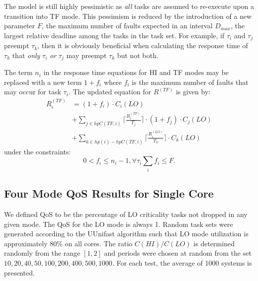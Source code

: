 	The model is still highly pessimistic as \emph{all} tasks are assumed to re-execute upon a transition into TF mode. 
	This pessimism is reduced by the introduction of a new parameter $F$, the maximum number of faults expected in an interval $D_{max}$, the largest relative deadline among the tasks in the task set.
	For example, if $\tau_i$ and $\tau_j$ preempt $\tau_k$, then it is obviously beneficial when calculating the response time of $\tau_k$ that \emph{only} $\tau_i$ \emph{or} $\tau_j$ may preempt $\tau_k$ but not both.

	The term $n_i$ in the response time equations for HI and TF modes may be replaced with a new term $1 + f_i$ where $f_i$ is the maximum number of faults that may occur for task $\tau_i$. The updated equation for $R^{(TF)}$ is given by:
	\begin{equation}\label{eq:mode3new}
\begin{aligned}
R_i^{(TF)} & = (1+f_i) \cdot C_i(LO) \\
&  +\sum_{j \in hpC(TF,i)}\Big\lceil\frac{R_i^{(TF)}}{T_j}\Big\rceil \cdot (1+f_j) \cdot C_j(LO) \\
&  +\sum_{k \in hp(i)-hpC(TF,i)}\Big\lceil\frac{R_i^{(LO)}}{T_k}\Big\rceil \cdot C_k(LO)
\end{aligned}
\end{equation}
under the constraints:
\begin{subequations}
\begin{equation}
0 < f_i \le n_i - 1,  \forall \tau_i
\end{equation}
\begin{equation}
\sum_i{f_i} \le F.
\end{equation}
\end{subequations}

\subsection{Four Mode QoS Results for Single Core}
\label{s:singlecore-results}
	We defined QoS to be the percentage of LO criticality tasks not dropped in any given mode. The QoS for the LO mode is always 1. Random task sets were generated according to the UUnifast algorithm \cite{bini2005measuring} such that LO mode utilization is approximately 80\% on all cores. The ratio $C(HI)/C(LO)$ is determined randomly from the range $[1,2]$ and periods were chosen at random from the set ${10,20,40,50,100,200,400,500,1000}$. For each test, the average of 1000 systems is presented.

